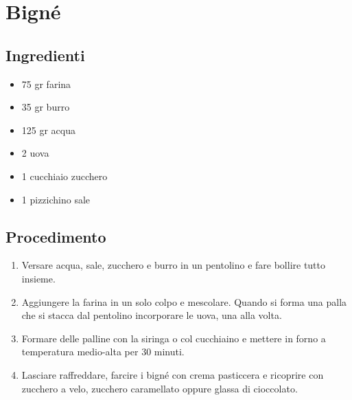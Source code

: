\section{Bigné}
\subsection{Ingredienti}
\begin{itemize}
\item 75 gr farina  
\item 35 gr burro  
\item 125 gr acqua  
\item 2 uova  
\item 1 cucchiaio zucchero  
\item 1 pizzichino sale
\end{itemize}
\subsection{Procedimento}
\begin{enumerate}
\item  Versare acqua, sale, zucchero e burro in un pentolino e fare bollire tutto insieme.  
\item  Aggiungere la farina in un solo colpo e mescolare. Quando si forma una palla che si stacca dal pentolino incorporare le uova, una alla volta.   
\item  Formare delle palline con la siringa o col cucchiaino e mettere in forno a temperatura medio-alta per 30 minuti.  
\item  Lasciare raffreddare, farcire i bigné con crema pasticcera e ricoprire con zucchero a velo, zucchero caramellato oppure glassa di cioccolato.
\end{enumerate}
